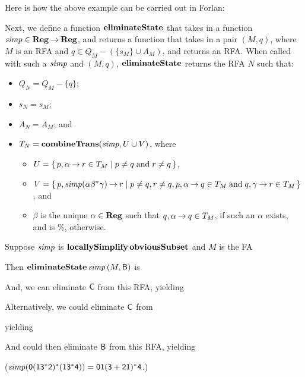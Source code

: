Here is how the above example can be carried out in Forlan:


%
Next, we define a function $\mathbf{eliminateState}$ that takes in a function
${\it simp}\in\mathbf{Reg}\mathbin{\to}\mathbf{Reg}$, and returns a function that takes in a pair
$(M, q)$, where $M$ is an RFA and $q\in Q_M-(\{s_M\}\cup A_M)$, and
returns an RFA.  When called with such a ${\it simp}$ and $(M,q)$,
$\mathbf{eliminateState}$ returns the RFA $N$ such that:
\begin{itemize}
\item $Q_N = Q_M - \{q\}$;

\item $s_N = s_M$;

\item $A_N = A_M$; and

\item $T_N = \mathbf{combineTrans}({\it simp}, U\cup V)$, where
  \begin{itemize}
  \item $U = \{ \, p,\alpha\mathbin{\to} r\in T_M \mid p\neq q\;\allowbreak\mbox{and}\allowbreak\;r\neq
      q \, \}$,

  \item $V = \{ \, p,{\it simp}(\alpha\beta^*\gamma)\mathbin{\to} r \mid p\neq q, r\neq
      q, p,\alpha\mathbin{\to} q\in T_M \;\allowbreak\mbox{and}\allowbreak\; q,\gamma\mathbin{\to} r\in T_M \, \}$, and

  \item $\beta$ is the unique $\alpha\in\mathbf{Reg}$ such that
    $q,\alpha\mathbin{\to} q\in T_M$, if such an $\alpha$ exists, and is $\%$,
    otherwise.
  \end{itemize}
\end{itemize}

Suppose ${\it simp}$ is $\mathbf{locallySimplify}\,\mathbf{obviousSubset}$ and $M$ is the FA
\begin{center}

\end{center}
Then $\mathbf{eliminateState}\,{\it simp}\,(M, \mathsf{B})$ is
\begin{center}

\end{center}
And, we can eliminate $\mathsf{C}$ from this RFA, yielding
\begin{center}

\end{center}
Alternatively, we could eliminate $\mathsf{C}$ from
\begin{center}

\end{center}
yielding
\begin{center}

\end{center}
And could then eliminate $\mathsf{B}$ from this RFA, yielding
\begin{center}

\end{center}
(${\it simp}(\mathsf{0(13^*2)^*(13^*4)}) = \mathsf{01(3+21)^*4}$.)

